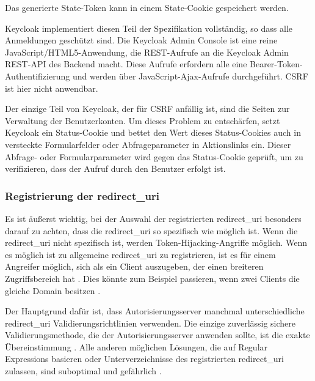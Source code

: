 Das generierte State-Token kann in einem State-Cookie gespeichert werden.

Keycloak implementiert diesen Teil der Spezifikation vollständig, so dass alle Anmeldungen geschützt sind. Die Keycloak Admin Console ist eine reine JavaScript/HTML5-Anwendung, die REST-Aufrufe an die Keycloak Admin REST-API des Backend macht. Diese Aufrufe erfordern alle eine Bearer-Token-Authentifizierung und werden über JavaScript-Ajax-Aufrufe durchgeführt. CSRF ist hier nicht anwendbar. \cite{keycloakDocs}

Der einzige Teil von Keycloak, der für CSRF anfällig ist, sind die Seiten zur Verwaltung der Benutzerkonten. Um dieses Problem zu entschärfen, setzt Keycloak ein Status-Cookie und bettet den Wert dieses Status-Cookies auch in versteckte Formularfelder oder Abfrageparameter in Aktionslinks ein. Dieser Abfrage- oder Formularparameter wird gegen das Status-Cookie geprüft, um zu verifizieren, dass der Aufruf durch den Benutzer erfolgt ist. \cite{keycloakDocs}

\subsubsection{Registrierung der redirect\_uri}

Es ist äußerst wichtig, bei der Auswahl der registrierten redirect\_uri besonders darauf zu achten, dass die redirect\_uri so spezifisch wie möglich ist. Wenn die redirect\_uri nicht spezifisch ist, werden Token-Hijacking-Angriffe möglich. Wenn es möglich ist zu allgemeine redirect\_uri zu registrieren, ist es für einem Angreifer möglich, sich als ein Client auszugeben, der einen breiteren Zugriffsbereich hat \cite{keycloakDocs}. Dies könnte zum Beispiel passieren, wenn zwei Clients die gleiche Domain besitzen \cite{keycloakDocs}.

Der Hauptgrund dafür ist, dass Autorisierungsserver manchmal unterschiedliche redirect\_uri Validierungsrichtlinien verwenden. Die einzige zuverlässig sichere Validierungsmethode, die der Autorisierungsserver anwenden sollte, ist die exakte Übereinstimmung \cite{OAuth2inAction}. Alle anderen möglichen Lösungen, die auf Regular Expressions basieren oder Unterverzeichnisse des registrierten redirect\_uri zulassen, sind suboptimal und gefährlich \cite{OAuth2inAction}.



